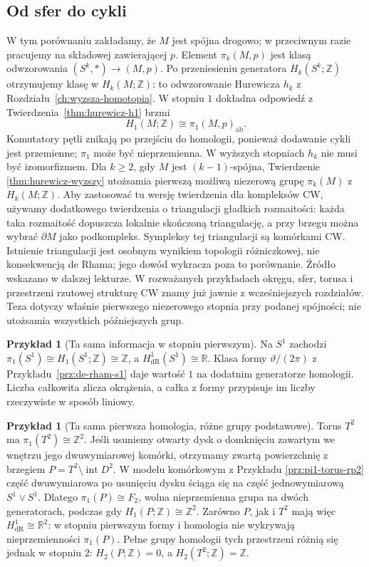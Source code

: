 \documentclass[11pt,a4paper,oneside]{report}
\newcommand{\R}{\mathbb{R}}
\newcommand{\Z}{\mathbb{Z}}
\theoremstyle{plain}
\theoremstyle{definition}
\newtheorem{przyklad}[twierdzenie]{Przykład}
\theoremstyle{remark}
\begin{document}
\subsection*{Od sfer do cykli}

W tym porównaniu zakładamy, że $M$ jest spójna drogowo;
w przeciwnym razie pracujemy na składowej zawierającej $p$.
Element $\pi_k(M,p)$ jest klasą odwzorowania
$(S^k,*)\to(M,p)$. Po przeniesieniu generatora
$H_k(S^k;\Z)$ otrzymujemy klasę w $H_k(M;\Z)$:
to odwzorowanie Hurewicza $h_k$
z Rozdziału~\ref{ch:wyzsza-homotopia}.
W stopniu $1$ dokładna odpowiedź z
Twierdzenia~\ref{thm:hurewicz-h1} brzmi
\[
 H_1(M;\Z)\cong\pi_1(M,p)_{\mathrm{ab}}.
\]
Komutatory pętli znikają po przejściu
do homologii, ponieważ dodawanie cykli
jest przemienne; $\pi_1$ może być nieprzemienna.
W wyższych stopniach $h_k$ nie musi być
izomorfizmem. Dla $k\geq2$, gdy $M$ jest
$(k-1)$-spójna, Twierdzenie
\ref{thm:hurewicz-wyzszy} utożsamia
pierwszą możliwą niezerową grupę
$\pi_k(M)$ z $H_k(M;\Z)$.
Aby zastosować tu wersję twierdzenia dla kompleksów CW,
używamy dodatkowego twierdzenia o triangulacji gładkich
rozmaitości: każda taka rozmaitość dopuszcza lokalnie
skończoną triangulację, a przy brzegu można wybrać
$\partial M$ jako podkompleks. Sympleksy tej triangulacji
są komórkami CW. Istnienie triangulacji jest osobnym
wynikiem topologii różniczkowej, nie konsekwencją de Rhama;
jego dowód wykracza poza to porównanie. Źródło wskazano
w dalszej lekturze. W rozważanych przykładach okręgu,
sfer, torusa i przestrzeni rzutowej strukturę CW znamy
już jawnie z wcześniejszych rozdziałów.
Teza dotyczy właśnie pierwszego
niezerowego stopnia przy podanej spójności;
nie utożsamia wszystkich późniejszych grup.

\begin{przyklad}[Ta sama informacja w stopniu pierwszym]
Na $S^1$ zachodzi
$\pi_1(S^1)\cong H_1(S^1;\Z)\cong\Z$,
a $H^1_{\mathrm{dR}}(S^1)\cong\R$.
Klasa formy $\vartheta/(2\pi)$ z
Przykładu~\ref{prz:de-rham-s1} daje wartość
$1$ na dodatnim generatorze homologii.
Liczba całkowita zlicza okrążenia, a całka
z formy przypisuje im liczby rzeczywiste
w sposób liniowy.
\end{przyklad}

\begin{przyklad}[Ta sama pierwsza homologia,
różne grupy podstawowe]
Torus $T^2$ ma $\pi_1(T^2)\cong\Z^2$.
Jeśli usuniemy otwarty dysk o domknięciu zawartym
we wnętrzu jego dwuwymiarowej komórki,
otrzymamy zwartą powierzchnię z brzegiem
$P=T^2\setminus\operatorname{int}D^2$.
W modelu komórkowym z Przykładu
\ref{prz:pi1-torus-rp2} część
dwuwymiarowa po usunięciu dysku ściąga się
na część jednowymiarową $S^1\vee S^1$.
Dlatego $\pi_1(P)\cong F_2$, wolna
nieprzemienna grupa na dwóch generatorach,
podczas gdy $H_1(P;\Z)\cong\Z^2$.
Zarówno $P$, jak i $T^2$ mają więc
$H^1_{\mathrm{dR}}\cong\R^2$:
w stopniu pierwszym formy i homologia
nie wykrywają nieprzemienności $\pi_1(P)$.
Pełne grupy homologii tych przestrzeni
różnią się jednak w stopniu $2$:
$H_2(P;\Z)=0$, a $H_2(T^2;\Z)=\Z$.
\end{przyklad}
\end{document}
